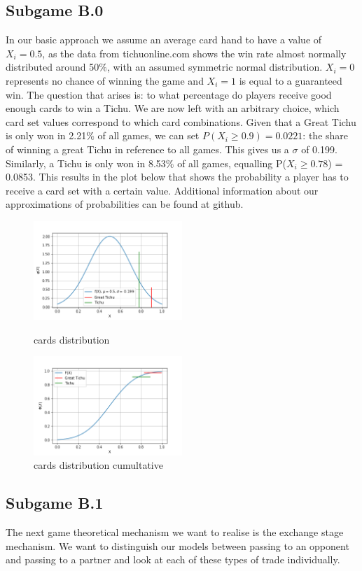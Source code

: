 \subsection{Subgame B.0}
In our basic approach we assume an average card hand to have a value of $X_i = 0.5$, as the data from tichuonline.com shows the win rate almost normally distributed around 50$\%$, with an assumed symmetric normal distribution. $X_i = 0$ represents no chance of winning the game and $X_i = 1$ is equal to a guaranteed win. The question that arises is: to what percentage do players receive good enough cards to win a Tichu. We are now left with an arbitrary choice, which card set values correspond to which card combinations. Given that a Great Tichu is only won in 2.21$\%$ of all games, we can set $P(X_i \geq 0.9) = 0.0221$: the share of winning a great Tichu in reference to all games. This gives us a $\sigma$ of 0.199. Similarly, a Tichu is only won in 8.53$\%$ of all games, equalling P($X_i\geq 0.78$) = 0.0853. This results in the plot below that shows the probability a player has to receive a card set with a certain value. Additional information about our approximations of probabilities can be found at github.

\begin{figure}[h]
    \centering
    \includegraphics[width=0.5\textwidth]{Bilder/cards_distribution}
    \caption{cards distribution}
    \label{fig:2}
    \centering
    \includegraphics[width=0.5\textwidth]{Bilder/cards_distribution_cumultative}
    \caption{cards distribution cumultative}
    \label{fig:3}
\end{figure}
\subsection{Subgame B.1}
The next game theoretical mechanism we want to realise is the exchange stage mechanism. We want to distinguish our models between passing to an opponent and passing to a partner and look at each of these types of trade individually. 


